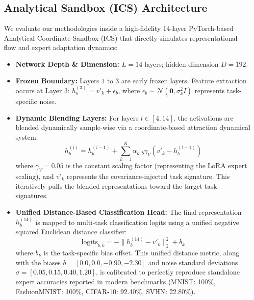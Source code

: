 \subsection{Analytical Sandbox (ICS) Architecture}
We evaluate our methodologies inside a high-fidelity 14-layer PyTorch-based Analytical Coordinate Sandbox (ICS) that directly simulates representational flow and expert adaptation dynamics:
\begin{itemize}
    \item \textbf{Network Depth \& Dimension:} $L = 14$ layers; hidden dimension $D = 192$.
    \item \textbf{Frozen Boundary:} Layers $1$ to $3$ are early frozen layers. Feature extraction occurs at Layer 3: $h_b^{(3)} = v'_k + \epsilon_b$, where $\epsilon_b \sim \mathcal{N}(\mathbf{0}, \sigma_k^2 I)$ represents task-specific noise.
    \item \textbf{Dynamic Blending Layers:} For layers $l \in [4, 14]$, the activations are blended dynamically sample-wise via a coordinate-based attraction dynamical system:
    \begin{equation}
        h_b^{(l)} = h_b^{(l-1)} + \sum_{k=1}^K \alpha_{k, b} \gamma_V (v'_k - h_b^{(l-1)})
    \end{equation}
    where $\gamma_V = 0.05$ is the constant scaling factor (representing the LoRA expert scaling), and $v'_k$ represents the covariance-injected task signature. This iteratively pulls the blended representations toward the target task signatures.
    \item \textbf{Unified Distance-Based Classification Head:} The final representation $h_b^{(14)}$ is mapped to multi-task classification logits using a unified negative squared Euclidean distance classifier:
    \begin{equation}
        \text{logits}_{b, k} = - \| h_b^{(14)} - v'_k \|_2^2 + b_k
    \end{equation}
    where $b_k$ is the task-specific bias offset. This unified distance metric, along with the biases $b = [0.0, 0.0, -0.90, -2.30]$ and noise standard deviations $\sigma = [0.05, 0.15, 0.40, 1.20]$, is calibrated to perfectly reproduce standalone expert accuracies reported in modern benchmarks (MNIST: 100\%, FashionMNIST: 100\%, CIFAR-10: 92.40\%, SVHN: 22.80\%).
\end{itemize}

